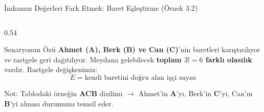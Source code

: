 ﻿\documentclass[light]{lutbeamer}
\begin{document}
\begin{frame}{İmkansız Değerleri Fark Etmek: Baret Eşleştirme (Örnek 3.2)}
\footnotesize
\vspace{-1cm}
\begin{columns}[T]
  \begin{column}{0.54\textwidth}
    \begin{block}{Senaryonun Özü}
      \textbf{Ahmet (A), Berk (B) ve Can (C)}'nin baretleri karıştırılıyor ve rastgele geri dağıtılıyor. Meydana gelebilecek \textbf{toplam $3! = 6$ farklı olasılık} vardır.
      Rastgele değişkenimiz:
      \[
      E = \text{kendi baretini doğru alan işçi sayısı}
      \]
    \end{block}

    \vspace{0.05cm}
    \scriptsize
    Not: Tablodaki örneğin \textbf{ACB} dizilimi $\rightarrow$ Ahmet'in \textbf{A}'yı, Berk'in \textbf{C}'yi, Can'ın \textbf{B}'yi alması durumunu temsil eder.


\end{column}
\end{columns}
\end{frame}
\end{document}
